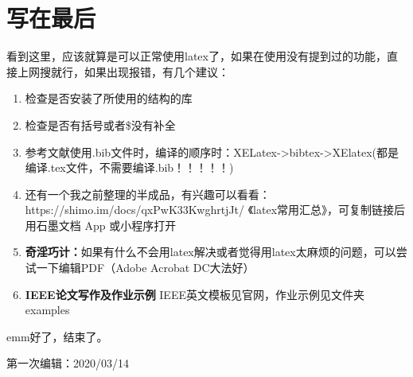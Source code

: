 \documentclass[UTF8]{ctexart}
\begin{document}
\section{写在最后}
看到这里，应该就算是可以正常使用latex了，如果在使用没有提到过的功能，直接上网搜就行，如果出现报错，有几个建议：
\begin{enumerate}
\item 检查是否安装了所使用的结构的库
\item 检查是否有括号或者\$没有补全
\item 参考文献使用.bib文件时，编译的顺序时：XELatex->bibtex->XElatex(都是编译.tex文件，不需要编译.bib！！！！！)
\item 还有一个我之前整理的半成品，有兴趣可以看看：https://shimo.im/docs/qxPwK33KwghrtjJt/ 
《latex常用汇总》，可复制链接后用石墨文档 App 或小程序打开
\item \textbf{奇淫巧计：}如果有什么不会用latex解决或者觉得用latex太麻烦的问题，可以尝试一下编辑PDF（Adobe Acrobat DC大法好）
\item \textbf{IEEE论文写作及作业示例} IEEE英文模板见官网，作业示例见文件夹examples
\end{enumerate}
emm好了，结束了。

第一次编辑：2020/03/14
\end{document}
